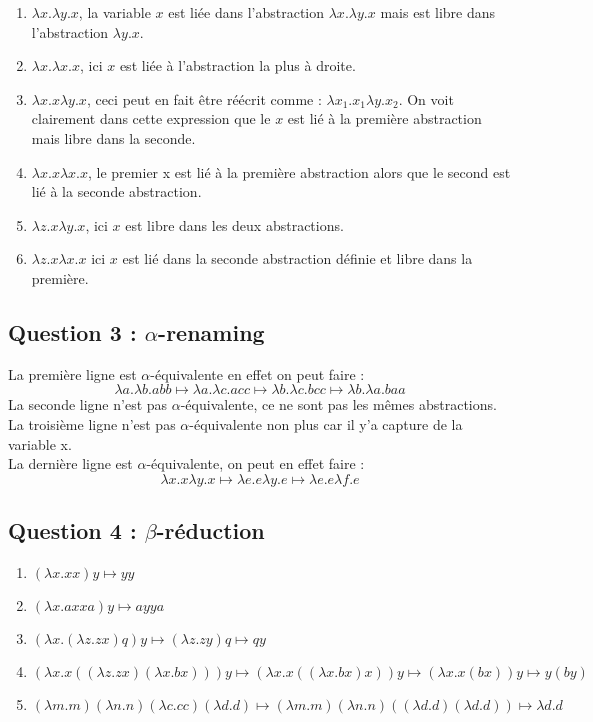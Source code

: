 \documentclass{article}
\begin{document}
\begin{enumerate}
    \item $\lambda x.\lambda y.x$, la variable $x$ est liée dans l'abstraction $\lambda x.\lambda y.x$ mais est libre dans l'abstraction $\lambda y.x$. \\
    \item $\lambda x.\lambda x.x$, ici $x$ est liée à l'abstraction la plus à droite. \\
    \item $\lambda x.x\lambda y.x$, ceci peut en fait être réécrit comme : $\lambda x_1.x_1 \lambda y.x_2$. On voit clairement dans cette expression que le $x$ est lié à la première abstraction mais libre dans la seconde.\\
    \item $\lambda x.x\lambda x.x$, le premier x est lié à la première abstraction alors que le second est lié à la seconde abstraction. \\
    \item $\lambda z.x\lambda y.x$, ici $x$ est libre dans les deux abstractions. \\
    \item $\lambda z.x\lambda x.x$ ici $x$ est lié dans la seconde abstraction définie et libre dans la première.
\end{enumerate}

\subsection{Question 3 : $\alpha$-renaming}

La première ligne est $\alpha$-équivalente en effet on peut faire : $$\lambda a.\lambda b.abb \mapsto \lambda a.\lambda c.acc \mapsto \lambda b.\lambda c.bcc \mapsto \lambda b.\lambda a.baa$$
La seconde ligne n'est pas $\alpha$-équivalente, ce ne sont pas les mêmes abstractions.\\
La troisième ligne n'est pas $\alpha$-équivalente non plus car il y'a capture de la variable x. \\
La dernière ligne est $\alpha$-équivalente, on peut en effet faire :
$$\lambda x.x\lambda y.x \mapsto \lambda e.e\lambda y.e \mapsto \lambda e.e\lambda f.e$$

\subsection{Question 4 : $\beta$-réduction}

\begin{enumerate}
    \item $(\lambda x.xx)y \mapsto yy$
    \item $(\lambda x.axxa)y \mapsto ayya$
    \item $(\lambda x.(\lambda z.zx)q)y \mapsto (\lambda z.zy)q \mapsto qy $
    \item $(\lambda x.x((\lambda z.zx)(\lambda x.bx)))y \mapsto (\lambda x.x((\lambda x.bx)x))y \mapsto (\lambda x.x(bx))y \mapsto y ( by)$
    \item $(\lambda m.m)(\lambda n.n)(\lambda c.cc)(\lambda d.d) \mapsto (\lambda m.m)(\lambda n.n)((\lambda d.d)( \lambda d.d)) \mapsto  \lambda d.d$
\end{enumerate}
\end{document}

